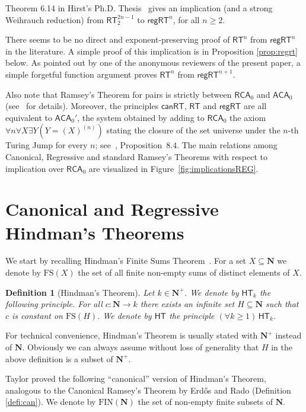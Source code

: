 \documentclass[a4paper,11pt]{article}
\newtheorem{definition}{Definition}
\newcommand\Nat{\mathbf{N}}
\newcommand\RCA{\mathsf{RCA}}
\newcommand\ACA{\mathsf{ACA}}
\newcommand\HT{\mathsf{HT}}
\newcommand\RT{\mathsf{RT}}
\newcommand\REG{\mathsf{regRT}}
\newcommand\CAN{\mathsf{canRT}}
\newcommand\FIN{\mathrm{FIN}}
\newcommand\FS{\mathrm{FS}}
\begin{document}
Theorem 6.14 in Hirst's Ph.D. Thesis~\cite{Hir:phd} gives an implication (and a strong Weihrauch reduction) 
from $\RT^{2n-1}_2$ to $\REG^n$, for all $n \geq 2$. 

There seems to be no direct and exponent-preserving proof of $\RT^n$ from $\REG^n$ in the literature. 
A simple proof of this implication is in Proposition \ref{prop:regrt} below. As pointed out by one of the anonymous reviewers of the present paper, a simple forgetful function argument proves $\RT^n$ from $\REG^{n+1}$.

Also note that Ramsey's Theorem for pairs is strictly between $\RCA_0$ and $\ACA_0$ (see~\cite{Hir:STT:14} for details). 
Moreover, the principles $\CAN$, $\RT$ and $\REG$ are all equivalent to $\ACA_0'$, the system obtained by adding to 
$\RCA_0$ the axiom $\forall n \forall X \exists Y (Y = (X)^{(n)})$ stating the closure of the set universe under the $n$-th Turing Jump for every $n$; see~\cite{Mil:08}, Proposition~8.4. The main relations among Canonical, Regressive and standard Ramsey's Theorems with respect to implication over $\RCA_0$ are visualized in Figure~\ref{fig:implicationsREG}.

\section{Canonical and Regressive Hindman's Theorems} 

We start by recalling Hindman's Finite Sums Theorem~\cite{Hin:74}. For a set $X\subseteq \Nat$ we denote by $\FS(X)$ the 
set of all finite non-empty sums of distinct elements of $X$.

\begin{definition}[Hindman's Theorem]\label{thm:ht}
Let $k\in\Nat^+$. We denote by $\HT_k$ the following principle. For all $c: \Nat \to k$ there exists an infinite set 
$H\subseteq \Nat$ such that $c$ is constant on $\FS(H)$. We denote by $\HT$ the principle $(\forall k\geq 1)\,\HT_k$.
\end{definition}

For technical convenience, Hindman's Theorem is usually stated with $\Nat^+$ instead of $\Nat$. Obviously we can always assume without loss of generality that $H$ in the above definition is a subset of $\Nat^+$.

Taylor \cite{Tay:76} proved the following ``canonical'' version of Hindman's Theorem, analogous to the Canonical Ramsey's Theorem by Erd\H{o}s and Rado (Definition \ref{defi:can}). We denote by $\FIN(\Nat)$ the set of non-empty finite subsets of $\Nat$.
\end{document}
